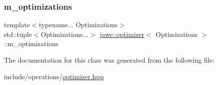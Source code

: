 \subsubsection{\texorpdfstring{m\+\_\+optimizations}{m\_optimizations}}
{\footnotesize\ttfamily template$<$typename... Optimizations$>$ \\
std\+::tuple$<$Optimizations...$>$ \hyperlink{classjawe_1_1optimizer}{jawe\+::optimizer}$<$ Optimizations $>$\+::m\+\_\+optimizations\hspace{0.3cm}{\ttfamily [private]}}



The documentation for this class was generated from the following file\+:\begin{DoxyCompactItemize}
\item 
include/operations/\hyperlink{optimizer_8hpp}{optimizer.\+hpp}\end{DoxyCompactItemize}
